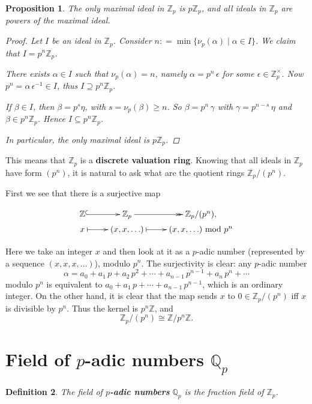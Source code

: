 \documentclass{article}
\newcommand{\term}{\textbf}
\newcommand{\isom}{\cong}
\newcommand{\dfn}{\mathrel{\mathop:}=}
\newcommand{\ZZ}{\mathbb{Z}}
\newcommand{\QQ}{\mathbb{Q}}
\renewcommand{\mod}{\mathop{\,\mathrm{mod}\,}}
\theoremstyle{myplain}
\newtheorem{proposition}{Proposition}[section]
\theoremstyle{mydefinition}
\newtheorem{definition}[proposition]{Definition}
\begin{document}
\begin{proposition}
  The only maximal ideal in $\ZZ_p$ is $p \ZZ_p$, and all ideals in $\ZZ_p$ are
  powers of the maximal ideal.

  \begin{proof}
    Let $I$ be an ideal in $\ZZ_p$. Consider
    $n \dfn \min \{ \nu_p (\alpha) \mid \alpha \in I \}$. We claim that
    $I = p^n \ZZ_p$.

    There exists $\alpha \in I$ such that $ \nu_p (\alpha) = n$, namely
    $\alpha = p^n\,\epsilon$ for some $\epsilon \in \ZZ_p^\times$. Now
    $p^n = \alpha\,\epsilon^{-1} \in I$, thus $I \supseteq p^n \ZZ_p$.

    If $\beta \in I$, then $\beta = p^s \eta$, with $s = \nu_p (\beta) \ge n$.
    So $\beta = p^n \, \gamma$ with $\gamma = p^{n-s}\,\eta$ and
    $\beta \in p^n \ZZ_p$. Hence $I \subseteq p^n \ZZ_p$.

    In particular, the only maximal ideal is $p \ZZ_p$.
  \end{proof}
\end{proposition}

This means that $\ZZ_p$ is a \term{discrete valuation ring}. Knowing that all
ideals in $\ZZ_p$ have form $(p^n)$, it is natural to ask what are the quotient
rings $\ZZ_p/(p^n)$.

First we see that there is a surjective map

\[ \xymatrix@R=0.2em{
\ZZ\ar@{^(->}[r] & \ZZ_p \ar@{->>}[r] & \ZZ_p/(p^n),\\
x \ar@{|->}[r] & (x,x,\ldots)\ar@{|->}[r] & (x,x,\ldots) \mod p^n
} \]

Here we take an integer $x$ and then look at it as a $p$-adic number
(represented by a sequence $(x,x,x,\ldots)$), modulo $p^n$. The surjectivity is
clear: any $p$-adic number
$$\alpha = a_0 + a_1\,p + a_2\,p^2 + \cdots + a_{n-1}\,p^{n-1} + a_n\,p^n + \cdots$$
modulo $p^n$ is equivalent to $a_0 + a_1\,p + \cdots + a_{n-1}\,p^{n-1}$, which
is an ordinary integer. On the other hand, it is clear that the map sends $x$ to
$0 \in \ZZ_p/(p^n)$ iff $x$ is divisible by $p^n$. Thus the kernel is $p^n \ZZ$,
and
$$\ZZ_p / (p^n) \isom \ZZ / p^n \ZZ.$$

\section{Field of $p$-adic numbers $\QQ_p$}

\begin{definition}
  The field of \term{$p$-adic numbers} $\QQ_p$ is the fraction field of $\ZZ_p$.
\end{definition}
\end{document}
